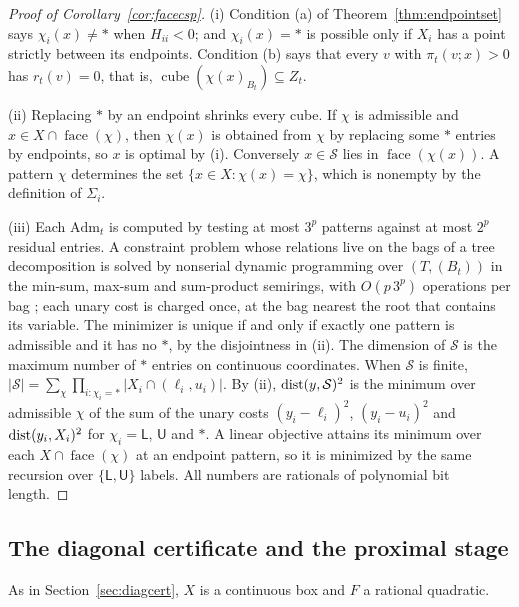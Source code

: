 \begin{proof}[Proof of Corollary~\ref{cor:facecsp}]
(i) Condition (a) of Theorem~\ref{thm:endpointset} says $\chi_i(x)\ne\ast$
when $H_{ii}<0$; and $\chi_i(x)=\ast$ is possible only if $X_i$ has a point
strictly between its endpoints. Condition (b) says that every $v$ with
$\pi_t(v;x)>0$ has $r_t(v)=0$, that is,
$\operatorname{cube}(\chi(x)_{B_t})\subseteq Z_t$.

(ii) Replacing $\ast$ by an endpoint shrinks every cube. If $\chi$ is
admissible and $x\in X\cap\operatorname{face}(\chi)$, then $\chi(x)$ is
obtained from $\chi$ by replacing some $\ast$ entries by endpoints, so $x$ is
optimal by (i). Conversely $x\in\mathcal S$ lies in
$\operatorname{face}(\chi(x))$. A pattern $\chi$ determines the set
$\{x\in X:\chi(x)=\chi\}$, which is nonempty by the definition of $\Sigma_i$.

(iii) Each $\mathrm{Adm}_t$ is computed by testing at most $3^p$ patterns
against at most $2^p$ residual entries. A constraint problem whose relations
live on the bags of a tree decomposition is solved by nonserial dynamic
programming over $(T,(B_t))$ in the min-sum, max-sum and sum-product
semirings, with $O(p\,3^p)$ operations per bag \cite{Dechter1999}; each unary
cost is charged once, at the bag nearest the root that contains its variable.
The minimizer is unique if and only if exactly one pattern is admissible and
it has no $\ast$, by the disjointness in (ii). The dimension of $\mathcal S$
is the maximum number of $\ast$ entries on continuous coordinates. When
$\mathcal S$ is finite,
$|\mathcal S|=\sum_\chi\prod_{i:\chi_i=\ast}|X_i\cap(\ell_i,u_i)|$. By (ii),
$\operatorname{dist}(y,\mathcal S)^2$ is the minimum over admissible $\chi$ of the sum of
the unary costs $(y_i-\ell_i)^2$, $(y_i-u_i)^2$ and $\operatorname{dist}(y_i,X_i)^2$ for
$\chi_i=\mathsf L$, $\mathsf U$ and $\ast$. A linear objective attains its
minimum over each $X\cap\operatorname{face}(\chi)$ at an endpoint pattern, so
it is minimized by the same recursion over $\{\mathsf L,\mathsf U\}$ labels.
All numbers are rationals of polynomial bit length.
\end{proof}

\subsection{The diagonal certificate and the proximal stage}

As in Section~\ref{sec:diagcert}, $X$ is a continuous box and $F$ a rational
quadratic.

